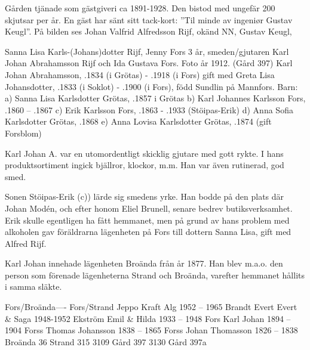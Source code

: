Gården tjänade som gästgiveri ca 1891-1928. Den bistod med ungefär 200 skjutsar per år. En gäst har sänt sitt tack-kort: ”Til minde av ingeniør Gustav Keugl”. På bilden ses Johan Valfrid Alfredsson Rijf, okänd NN, Gustav Keugl,


Sanna Lisa Karls-(Johans)dotter Rijf, Jenny Fors 3 år, smeden/gjutaren Karl Johan Abrahamsson Rijf och Ida Gustava Fors. Foto år 1912. (Gård 397)
Karl Johan Abrahamsson, .1834 (i Grötas) - .1918 (i Fors) gift med Greta Lisa Johansdotter, .1833 (i Soklot) - .1900 (i Fors), född Sundlin på Mannfors.
Barn: a) Sanna Lisa Karlsdotter Grötas, .1857 i Grötas
b) Karl Johannes Karlsson Fors, .1860 – .1867
c) Erik Karlsson Fors, .1863 - .1933 (Stöipas-Erik) d) Anna Sofia Karlsdotter Grötas, .1868
e) Anna Lovisa Karlsdotter Grötas, .1874 (gift Forsblom)

Karl Johan A. var en utomordentligt skicklig gjutare med gott rykte. I hans produktsortiment ingick bjällror, klockor, m.m. Han var även rutinerad, god smed.

Sonen Stöipas-Erik (c)) lärde sig smedens yrke. Han bodde på den plats där Johan Modén, och efter honom Eliel Brunell, senare bedrev butiksverksamhet. Erik skulle egentligen ha fått hemmanet, men på grund av hans problem med alkoholen gav föräldrarna lägenheten på Fors till dottern Sanna Lisa, gift med Alfred Rijf.

Karl Johan innehade lägenheten Broända från år 1877. Han blev m.a.o. den person som förenade lägenheterna Strand och Broända, varefter hemmanet hållits i samma släkte.

Fors/Broända----
Fors/Strand
Jeppo Kraft Alg
1952 – 1965
Brandt Evert Evert \& Saga 1948-1952
Ekström
Emil \& Hilda 1933 – 1948
Fors
Karl Johan 1894 – 1904
Forss
Thomas Johansson 1838 – 1865
Forss
Johan Thomasson 1826 – 1838
   Broända 36
Strand 315
3109 Gård 397
3130 Gård 397a

